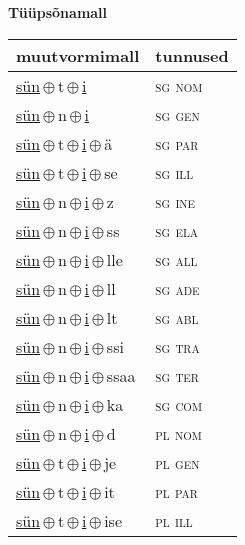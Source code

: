 

\vspace{3.5em}
\noindent \begin{minipage}{\textwidth}
\noindent \textbf{Tüüpsõnamall \,}\\

\begin{sideways}
\begin{tabular}{l l}
muutvormimall & tunnused \\
\hline
\underline{sün}\,$\oplus$\,t\,$\oplus$\,\underline{i} & \textsc{ sg nom } \\
\underline{sün}\,$\oplus$\,n\,$\oplus$\,\underline{i} & \textsc{ sg gen } \\
\underline{sün}\,$\oplus$\,t\,$\oplus$\,\underline{i}\,$\oplus$\,ä & \textsc{ sg par } \\
\underline{sün}\,$\oplus$\,t\,$\oplus$\,\underline{i}\,$\oplus$\,se & \textsc{ sg ill } \\
\underline{sün}\,$\oplus$\,n\,$\oplus$\,\underline{i}\,$\oplus$\,z & \textsc{ sg ine } \\
\underline{sün}\,$\oplus$\,n\,$\oplus$\,\underline{i}\,$\oplus$\,ss & \textsc{ sg ela } \\
\underline{sün}\,$\oplus$\,n\,$\oplus$\,\underline{i}\,$\oplus$\,lle & \textsc{ sg all } \\
\underline{sün}\,$\oplus$\,n\,$\oplus$\,\underline{i}\,$\oplus$\,ll & \textsc{ sg ade } \\
\underline{sün}\,$\oplus$\,n\,$\oplus$\,\underline{i}\,$\oplus$\,lt & \textsc{ sg abl } \\
\underline{sün}\,$\oplus$\,n\,$\oplus$\,\underline{i}\,$\oplus$\,ssi & \textsc{ sg tra } \\
\underline{sün}\,$\oplus$\,n\,$\oplus$\,\underline{i}\,$\oplus$\,ssaa & \textsc{ sg ter } \\
\underline{sün}\,$\oplus$\,n\,$\oplus$\,\underline{i}\,$\oplus$\,ka & \textsc{ sg com } \\
\underline{sün}\,$\oplus$\,n\,$\oplus$\,\underline{i}\,$\oplus$\,d & \textsc{ pl nom } \\
\underline{sün}\,$\oplus$\,t\,$\oplus$\,\underline{i}\,$\oplus$\,je & \textsc{ pl gen } \\
\underline{sün}\,$\oplus$\,t\,$\oplus$\,\underline{i}\,$\oplus$\,it & \textsc{ pl par } \\
\underline{sün}\,$\oplus$\,t\,$\oplus$\,\underline{i}\,$\oplus$\,ise & \textsc{ pl ill } \\

\end{tabular}
\end{sideways}
\end{minipage}
